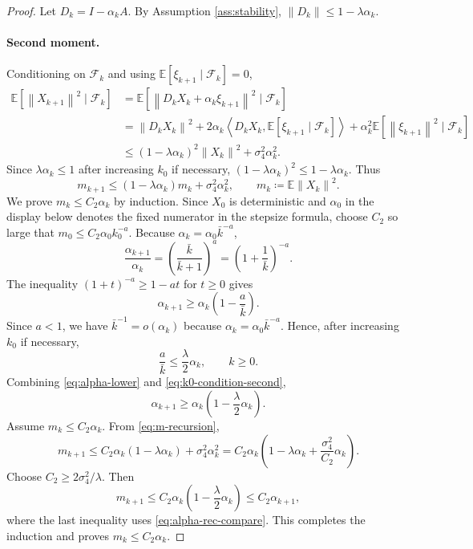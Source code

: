 \documentclass{article}
\newcommand{\E}{\mathbb{E}}
\newcommand{\norm}[1]{\left\lVert #1\right\rVert}
\newcommand{\ip}[2]{\left\langle #1,#2\right\rangle}
\begin{document}
\begin{proof}
Let $D_k=I-\alpha_kA$. By Assumption \ref{ass:stability}, $\norm{D_k}\le1-\lambda\alpha_k$.

\paragraph{Second moment.}
Conditioning on $\mathcal F_k$ and using $\E[\xi_{k+1}\mid\mathcal F_k]=0$,
\[
\begin{aligned}
  \E[\norm{X_{k+1}}^2\mid\mathcal F_k]
  &=\E[\norm{D_kX_k+\alpha_k\xi_{k+1}}^2\mid\mathcal F_k]\\
  &=\norm{D_kX_k}^2
    +2\alpha_k\ip{D_kX_k}{\E[\xi_{k+1}\mid\mathcal F_k]}
    +\alpha_k^2\E[\norm{\xi_{k+1}}^2\mid\mathcal F_k]\\
  &\le (1-\lambda\alpha_k)^2\norm{X_k}^2+\sigma_4^2\alpha_k^2.
\end{aligned}
\]
Since $\lambda\alpha_k\le1$ after increasing $k_0$ if necessary, $(1-\lambda\alpha_k)^2\le1-\lambda\alpha_k$. Thus
\begin{equation}
  m_{k+1}\le (1-\lambda\alpha_k)m_k+\sigma_4^2\alpha_k^2,\qquad
  m_k\coloneqq \E\norm{X_k}^2. \label{eq:m-recursion}
\end{equation}
We prove $m_k\le C_2\alpha_k$ by induction. Since $X_0$ is deterministic and $\alpha_0$ in the display below denotes the fixed numerator in the stepsize formula, choose $C_2$ so large that $m_0\le C_2\alpha_0 k_0^{-a}$. Because $\alpha_k=\alpha_0\bar k^{-a}$,
\[
  \frac{\alpha_{k+1}}{\alpha_k}=\left(\frac{\bar k}{\bar k+1}\right)^a
  =\left(1+\frac1{\bar k}\right)^{-a}.
\]
The inequality $(1+t)^{-a}\ge1-at$ for $t\ge0$ gives
\begin{equation}
  \alpha_{k+1}\ge \alpha_k\left(1-\frac{a}{\bar k}\right). \label{eq:alpha-lower}
\end{equation}
Since $a<1$, we have $\bar k^{-1}=o(\alpha_k)$ because $\alpha_k=\alpha_0\bar k^{-a}$. Hence, after increasing $k_0$ if necessary,
\begin{equation}
  \frac{a}{\bar k}\le \frac{\lambda}{2}\alpha_k,
  \qquad k\ge0. \label{eq:k0-condition-second}
\end{equation}
Combining \eqref{eq:alpha-lower} and \eqref{eq:k0-condition-second},
\begin{equation}
  \alpha_{k+1}\ge \alpha_k\left(1-\frac{\lambda}{2}\alpha_k\right). \label{eq:alpha-rec-compare}
\end{equation}
Assume $m_k\le C_2\alpha_k$. From \eqref{eq:m-recursion},
\[
  m_{k+1}\le C_2\alpha_k(1-\lambda\alpha_k)+\sigma_4^2\alpha_k^2
  =C_2\alpha_k\left(1-\lambda\alpha_k+\frac{\sigma_4^2}{C_2}\alpha_k\right).
\]
Choose $C_2\ge 2\sigma_4^2/\lambda$. Then
\[
  m_{k+1}\le C_2\alpha_k\left(1-\frac{\lambda}{2}\alpha_k\right)
  \le C_2\alpha_{k+1},
\]
where the last inequality uses \eqref{eq:alpha-rec-compare}. This completes the induction and proves $m_k\le C_2\alpha_k$.


\end{proof}
\end{document}
